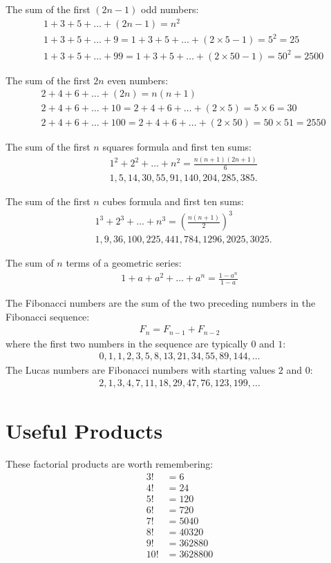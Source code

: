 \documentclass[12pt]{article}
\begin{document}
The sum of the first $(2n-1)$ odd numbers:
\begin{align*}
& 1+3+5+\ldots+(2n-1) = n^2 \\
& 1+3+5+\ldots+9 = 1+3+5+\ldots+(2\times5-1) = 5^2 = 25 \\
& 1+3+5+\ldots+99 = 1+3+5+\ldots+(2\times50-1) = 50^2 =  2500
\end{align*}

The sum of the first $2n$ even numbers:
\begin{align*}
& 2+4+6+\ldots+(2n) = n(n+1) \\
& 2+4+6+\ldots+10 = 2+4+6+\ldots+(2\times5) = 5 \times 6 = 30 \\
& 2+4+6+\ldots+100 = 2+4+6+\ldots+(2\times50) = 50\times51 = 2550
\end{align*}

The sum of the first $n$ squares formula and first ten sums:
\begin{align*}
& 1^2+2^2+\ldots+n^2 = \frac{n(n+1)(2n+1)}{6} \\
& 1, 5, 14, 30, 55, 91, 140, 204, 285, 385.
\end{align*}

The sum of the first $n$ cubes formula and first ten sums:
\begin{align*}
& 1^3+2^3+\ldots+n^3 = \left(\frac{n(n+1)}{2}\right)^{3} \\
& 1, 9, 36, 100, 225, 441, 784, 1296, 2025, 3025.
\end{align*}


The sum of $n$ terms of a geometric series:
\begin{align*}
1 + a + a^2 + \ldots + a^n
 = \frac{1-a^n}{1-a}
\end{align*}


The Fibonacci numbers are the sum of the two preceding numbers in the Fibonacci sequence:
\begin{align*}
F_{n} = F_{n-1} + F_{n-2}
\end{align*}
where the first two numbers in the sequence are typically $0$ and $1$:
\begin{align*}
0, 1 , 1, 2, 3, 5, 8, 13, 21, 34, 55, 89, 144, \ldots
\end{align*}
The Lucas numbers are Fibonacci numbers with starting values $2$ and $0$:
\begin{align*}
2, 1, 3, 4, 7, 11, 18, 29, 47, 76, 123, 199, \ldots
\end{align*}


\section*{Useful Products}
These factorial products are worth remembering:
\begin{align*}
 3! & = 6 \\
 4! & = 24 \\
 5! & = 120 \\
 6! & = 720 \\
 7! & = 5040 \\
 8! & = 40320 \\
 9! & = 362880 \\
10! & = 3628800 
\end{align*}
\end{document}
